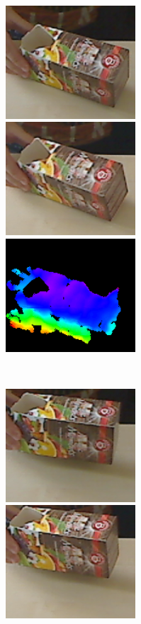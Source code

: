 \begin{figure}[tbh]
\centering
\begin{subfigure}[b]{\linewidth}
	\centering
	\includegraphics[width=137pt]{figures/tiny_vis_153_left.png}\hspace{5pt}
	\includegraphics[width=137pt]{figures/tiny_vis_153_right.png}\hspace{5pt}
	\includegraphics[width=137pt]{figures/tiny_vis_153.png}
	\caption{}
  \end{subfigure} \\\vspace{5pt}
  \begin{subfigure}[b]{\linewidth}
	\centering
	\includegraphics[width=137pt]{figures/tiny_vis_76_left.png}\hspace{5pt}
	\includegraphics[width=137pt]{figures/tiny_vis_76_right.png}\hspace{5pt}

\end{subfigure}
\end{figure}
